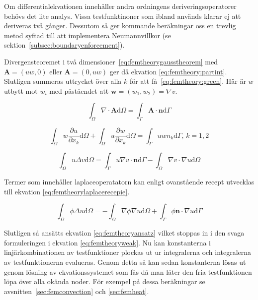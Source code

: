 \noindent
Om differentialekvationen innehåller andra ordningens deriveringsoperatorer behövs
det lite analys. Vissa testfunktinoner som ibland används klarar ej att deriveras
två gånger. Dessutom så ger kommande beräkningar oss en trevlig metod syftad
till att implementera Neumannvillkor (se sektion~\ref{subsec:boundaryenforcement}).

Divergensteoremet i två dimensioner~\eqref{eq:femtheorygausstheorem}
med $\mathbf{A} = (uw, 0)$ eller $\mathbf{A} = (0, uw)$ ger då ekvation
\eqref{eq:femtheory:partint}. Slutligen summeras uttrycket över alla
$k$ för att få~\eqref{eq:femtheory:green}. Här är $w$ utbytt mot $w_i$ med
påståendet att $\mathbf{w} = (w_1, w_2) = \nabla v$. \cite{johnson2009}

\begin{equation}
\label{eq:femtheorygausstheorem}
\int_\Omega \nabla\cdot \mathbf{A} \mathrm{d}\Omega = \int_\Gamma \mathbf{A}\cdot\mathbf{n}
\mathrm{d}\Gamma
\end{equation}

\begin{equation}
\label{eq:femtheory:partint}
\int_\Omega w\frac{\partial u}{\partial x_k} \mathrm{d}\Omega +
\int_\Omega u\frac{\partial w}{\partial x_k} \mathrm{d}\Omega =
\int_\Gamma uwn_k \mathrm{d}\Gamma\mbox{,   }k=1,2
\end{equation}

\begin{equation}
\label{eq:femtheory:green}
\int_\Omega u\Delta v \mathrm{d}\Omega =
\int_\Gamma u\nabla v\cdot\mathbf{n}\mathrm{d}\Gamma-\int_\Omega \nabla v\cdot\nabla u \mathrm{d}\Omega
\end{equation}

\noindent
Termer som innehåller laplaceoperatatorn kan enligt ovanstående recept utvecklas
till ekvation \eqref{eq:femtheorylaplacerecepie}.

\begin{equation}
\label{eq:femtheorylaplacerecepie}
\int_\Omega \phi\Delta u \mathrm{d}\Omega = -\int_\Omega \nabla\phi\nabla u \mathrm{d}\Omega +
\int_\Gamma \phi \mathbf{n}\cdot\nabla u \mathrm{d}\Gamma
\end{equation} 

\noindent
Slutligen så ansätts ekvation \eqref{eq:femtheoryansatz} vilket stoppas
in i den svaga formuleringen i ekvation \eqref{eq:femtheoryweak}. Nu kan
konstanterna i linjärkombinationen av testfunktioner plockas ut ur integralerna
och integralerna av testfunktionerna evalueras. Genom detta så kan
sedan konstanterna lösas ut genom lösning av ekvationssystemet som
fås då man låter den fria testfunktionen löpa över alla okända noder.
För exempel på dessa beräkningar se avsnitten~\ref{sec:femconvection} och
\ref{sec:femheat}.


